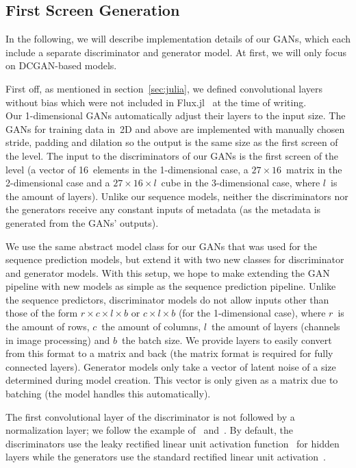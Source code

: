 \subsection{First Screen Generation}
\label{sec:first-screen-generation}

In the following, we will describe implementation details of our GANs,
which each include a separate discriminator and generator model.
At first, we will only focus on DCGAN-based models.

First off, as mentioned in section~\ref{sec:julia}, we defined
convolutional layers without bias which were not included in
\mbox{Flux.jl}~\cite{FluxMLFluxJl2019} at the time of writing. \\
Our 1-dimensional GANs automatically adjust their layers to the input
size. The GANs for training data in~2D and above are implemented with
manually chosen stride, padding and dilation so the output is the same
size as the first screen of the level. The input to the discriminators
of our GANs is the first screen of the level (a vector of 16~elements
in the 1-dimensional case, a $27 \times 16$~matrix in the 2-dimensional
case and a $27 \times 16 \times l$~cube in the 3-dimensional case, where
$l$~is the amount of layers). Unlike our sequence models, neither the
discriminators nor the generators receive any constant inputs of
metadata (as the metadata is generated from the GANs' outputs).

We use the same abstract model class for our GANs that was used for
the sequence prediction models, but extend it with two new classes for
discriminator and generator models. With this setup, we hope to make
extending the GAN pipeline with new models as simple as the sequence
prediction pipeline. Unlike the sequence predictors, discriminator
models do not allow inputs other than those of the form
$r \times c \times l \times b$ or $c \times l \times b$ (for the
1-dimensional case), where $r$~is the amount of rows, $c$~the amount
of columns, $l$~the amount of layers (channels in image processing)
and $b$~the batch size. We provide layers to easily convert from this
format to a matrix and back (the matrix format is required for fully
connected layers). Generator models only take a vector of latent noise
of a size determined during model creation. This vector is only given
as a matrix due to batching (the model handles this automatically).

The first convolutional layer of the discriminator is not followed by
a normalization layer; we follow the example
of~\cite{PytorchExamples2019}
and~\cite{martinarjovskyMartinarjovskyWassersteinGAN2019}. By default,
the discriminators use the leaky rectified linear unit activation
function~\cite{maasRectifierNonlinearitiesImprove,RectifierNeuralNetworks2019}
for hidden layers while the generators use the standard rectified
linear unit
activation~\cite{nairRectifiedLinearUnits,RectifierNeuralNetworks2019}.

